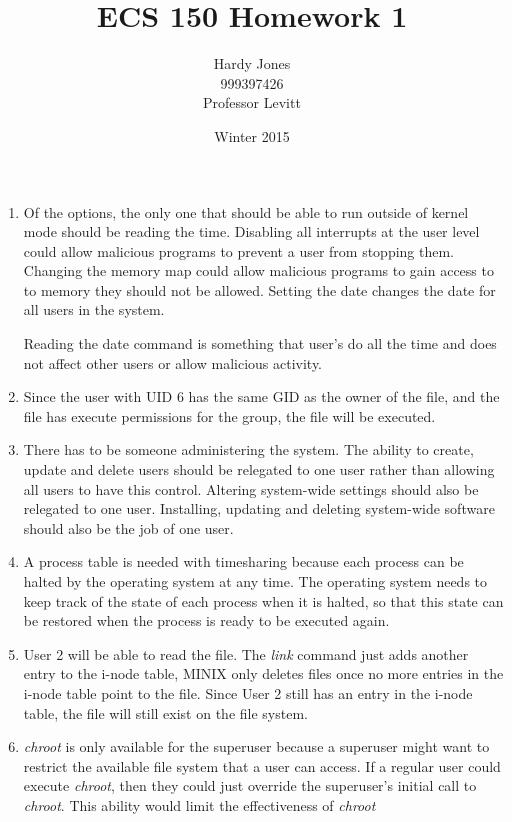 \documentclass[12pt,letterpaper]{article}
\title{ECS 150 Homework 1\vspace{-2ex}}
\author{Hardy Jones\\
        999397426\\
        Professor Levitt\vspace{-2ex}}
\date{Winter 2015}
\begin{document}
  \maketitle

  \begin{enumerate}
    \item
      Of the options, the only one that should be able to run outside of kernel mode should be reading the time.
      Disabling all interrupts at the user level could allow malicious programs to prevent a user from stopping them.
      Changing the memory map could allow malicious programs to gain access to to memory they should not be allowed.
      Setting the date changes the date for all users in the system.

      Reading the date command is something that user's do all the time and does not affect other users or allow malicious activity.

    \item
      Since the user with UID 6 has the same GID as the owner of the file,
      and the file has execute permissions for the group,
      the file will be executed.

    \item
      There has to be someone administering the system.
      The ability to create, update and delete users should be relegated to one user rather than allowing all users to have this control.
      Altering system-wide settings should also be relegated to one user.
      Installing, updating and deleting system-wide software should also be the job of one user.

    \item
      A process table is needed with timesharing because each process can be halted by the operating system at any time.
      The operating system needs to keep track of the state of each process when it is halted,
      so that this state can be restored when the process is ready to be executed again.

    \item
      User 2 will be able to read the file.
      The \textit{link} command just adds another entry to the i-node table,
      MINIX only deletes files once no more entries in the i-node table point to the file.
      Since User 2 still has an entry in the i-node table, the file will still exist on the file system.

    \item
      \textit{chroot} is only available for the superuser because a superuser might want to restrict the available file system that a user can access.
      If a regular user could execute \textit{chroot},
      then they could just override the superuser's initial call to \textit{chroot}.
      This ability would limit the effectiveness of \textit{chroot}


\end{enumerate}
\end{document}
